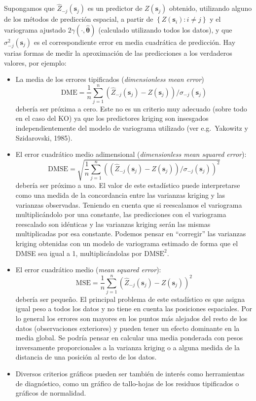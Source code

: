 \documentclass[
  spanish,
]{book}
\theoremstyle{break}
\theoremstyle{definition}
\theoremstyle{definition}
\theoremstyle{definition}
\theoremstyle{definition}
\theoremstyle{remark}
\begin{document}
Supongamos que \(\hat{Z}_{-j}(\mathbf{s}_{j})\) es un predictor de \(Z(\mathbf{s}_{j})\) obtenido, utilizando alguno de los métodos de predicción espacial, a partir de \(\left\{ Z(\mathbf{s}_{i}):i\neq j\right\}\) y el variograma ajustado \(2\gamma(\cdot ,\hat{\boldsymbol{\theta}})\) (calculado utilizando todos los datos), y que \(\sigma_{-j}^2 (\mathbf{s}_{j})\) es el correspondiente error en media cuadrática de predicción.
Hay varias formas de medir la aproximación de las predicciones a los verdaderos valores, por ejemplo:

\begin{itemize}
\item
  La media de los errores tipificados (\emph{dimensionless mean error})
  \[\text{DME} =\dfrac{1}{n} \sum\limits_{j=1}^{n}\left( \hat{Z}_{-j}(\mathbf{s}_{j})-Z(\mathbf{s}_{j})\right) /\sigma_{-j}(\mathbf{s}_{j})\]
  debería ser próxima a cero. Este no es un criterio muy adecuado (sobre todo en el caso del KO) ya que los predictores kriging son insesgados independientemente del modelo de variograma utilizado (ver e.g.~Yakowitz y Szidarovski, 1985).
\item
  El error cuadrático medio adimensional (\emph{dimensionless mean squared error}):
  \[\text{DMSE} =\sqrt{\dfrac{1}{n} \sum\limits_{j=1}^{n}\left( \left( \hat{Z}_{-j}(\mathbf{s}_{j})-Z(\mathbf{s}_{j})\right) /\sigma_{-j}(\mathbf{s}_{j})\right)^2  }\]
  debería ser próximo a uno.
  El valor de este estadístico puede interpretarse como una medida de la concordancia entre las varianzas kriging y las varianzas observadas.
  Teniendo en cuenta que si reescalamos el variograma multiplicándolo por una constante, las predicciones con el variograma reescalado son idénticas y las varianzas kriging serán las mismas multiplicadas por esa constante.
  Podemos pensar en ``corregir'' las varianzas kriging obtenidas con un modelo de variograma estimado de forma que el DMSE sea igual a 1, multiplicándolas por \(\text{DMSE}^2\).
\item
  El error cuadrático medio (\emph{mean squared error}):
  \[\text{MSE} =\dfrac{1}{n} \sum\limits_{j=1}^{n}\left( \hat{Z}_{-j}(\mathbf{s}_{j})-Z(\mathbf{s}_{j})\right)^2\] debería ser pequeño.
  El principal problema de este estadístico es que asigna igual peso a todos los datos y no tiene en cuenta las posiciones espaciales.
  Por lo general los errores son mayores en los puntos más alejados del resto de los datos (observaciones exteriores) y pueden tener un efecto dominante en la media global.
  Se podría pensar en calcular una media ponderada con pesos inversamente proporcionales a la varianza kriging o a alguna medida de la distancia de una posición al resto de los datos.
\item
  Diversos criterios gráficos pueden ser también de interés como herramientas de diagnóstico, como un gráfico de tallo-hojas de los residuos tipificados o gráficos de normalidad.
\end{itemize}
\end{document}
